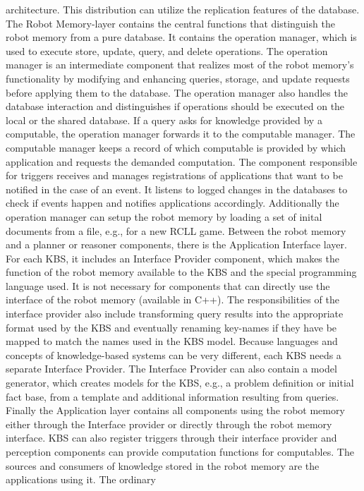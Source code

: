 architecture. This distribution can utilize the replication features
of the database. The Robot Memory-layer contains the central functions
that distinguish the robot memory from a pure database. It contains
the operation manager, which is used to execute store, update, query,
and delete operations. The operation manager is an intermediate
component that realizes most of the robot memory's functionality by
modifying and enhancing queries, storage, and update requests before
applying them to the database. The operation manager also handles the
database interaction and distinguishes if operations should be
executed on the local or the shared database.  If a query asks for
knowledge provided by a computable, the operation manager forwards it
to the computable manager. The computable manager keeps a record of
which computable is provided by which application and requests the
demanded computation. The component responsible for triggers
receives and manages registrations of applications that want to be
notified in the case of an event. It listens to logged changes in the
databases to check if events happen and notifies applications
accordingly. Additionally the operation manager can setup the
robot memory by loading a set of inital documents from a file, e.g., for a new RCLL game.
Between the robot memory and a planner or reasoner components, there
is the Application Interface layer. For each KBS, it includes an
Interface Provider component, which makes the function of the robot
memory available to the KBS and the special programming language
used. It is not necessary for components that can directly use the
interface of the robot memory (available in C++). The responsibilities
of the interface provider also include transforming query results into
the appropriate format used by the KBS and eventually renaming
key-names if they have be mapped to match the names used in the KBS
model. Because languages and concepts of knowledge-based systems can
be very different, each KBS needs a separate Interface Provider. The
Interface Provider can also contain a model generator, which creates
models for the KBS, e.g., a problem definition or initial fact base, from a
template and additional information resulting from queries. Finally the
Application layer contains all components using the robot memory
either through the Interface provider or directly through the robot
memory interface. KBS can also register triggers through their
interface provider and perception components can provide computation
functions for computables. The sources and consumers of knowledge
stored in the robot memory are the applications using it. The ordinary
